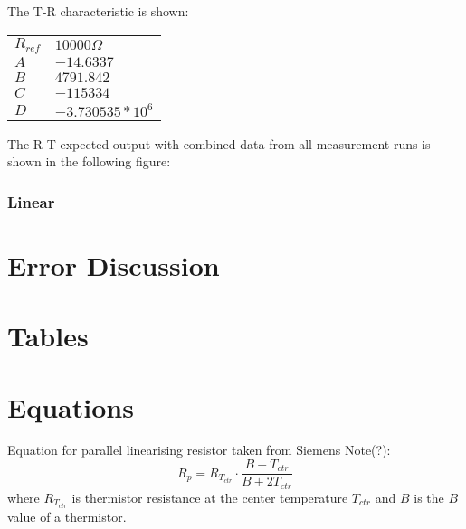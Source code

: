 \documentclass[a4,11pt]{article}
\begin{document}
The T-R characteristic is shown:
\begin{center}
  \begin{tabular}{ll}
    \hline 
    $R_{ref}$  &  $10000\Omega$  \\
    $A$  &  $-14.6337$  \\
    $B$  &  $4791.842$  \\
    $C$  &  $-115334$  \\
    $D$  &  $-3.730535*10^6$  \\
    \hline
    \end{tabular}
\end{center}
The R-T expected output with combined data from all measurement runs is shown in the following figure:
\subsubsection{Linear}
\section{Error Discussion}
\label{sec:error}
\section{Tables}
\section{Equations}

Equation for parallel linearising resistor taken from Siemens Note(?):
$$R_p=R_{T_{ctr}}\cdot\frac{B-T_{ctr}}{B+2T_{ctr}}$$
where $R_{T_{ctr}}$ is thermistor resistance at the center temperature $T_{ctr}$ and $B$ is the $B$ value of a thermistor.
\end{document}
